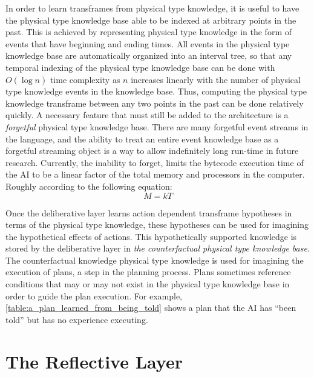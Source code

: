 In order to learn transframes from physical type knowledge, it is
useful to have the physical type knowledge base able to be indexed at
arbitrary points in the past.  This is achieved by representing
physical type knowledge in the form of events that have beginning and
ending times.  All events in the physical type knowledge base are
automatically organized into an interval tree, so that any temporal
indexing of the physical type knowledge base can be done with $O(\log
n)$ time complexity as $n$ increases linearly with the number of
physical type knowledge events in the knowledge base.  Thus, computing
the physical type knowledge transframe between any two points in the
past can be done relatively quickly.  A necessary feature that must
still be added to the architecture is a \emph{forgetful} physical type
knowledge base.  There are many forgetful event streams in the
language, and the ability to treat an entire event knowledge base as a
forgetful streaming object is a way to allow indefinitely long
run-time in future research.  Currently, the inability to forget,
limits the bytecode execution time of the AI to be a linear factor of
the total memory and processors in the computer.  Roughly according to
the following equation:
\begin{equation}
M = kT
\end{equation}

Once the deliberative layer learns action dependent transframe
hypotheses in terms of the physical type knowledge, these hypotheses
can be used for imagining the hypothetical effects of actions.  This
hypothetically supported knowledge is stored by the deliberative layer
in \emph{the counterfactual physical type knowledge base}.  The
counterfactual knowledge physical type knowledge is used for imagining
the execution of plans, a step in the planning process.  Plans
sometimes reference conditions that may or may not exist in the
physical type knowledge base in order to guide the plan execution.
For example, {\mbox{\autoref{table:a_plan_learned_from_being_told}}}
shows a plan that the AI has ``been told'' but has no experience
executing.

\section{The Reflective Layer}


